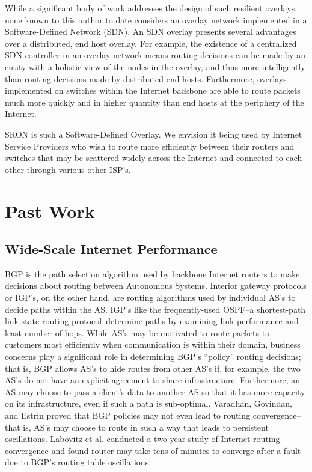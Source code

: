 \documentclass[pageno]{jpaper}
\begin{document}
While a significant body of work addresses the design of such resilient overlays,
none known to this author to date considers an overlay network implemented in a 
Software-Defined Network (SDN).  An SDN overlay presents several advantages over a 
distributed, end host overlay.  For example, the existence of a centralized SDN
controller in an overlay network means routing decisions can be made by an entity 
with a holistic view of the nodes in the overlay, and thus more intelligently than 
routing decisions made by distributed end hosts.  Furthermore, overlays implemented on
switches within the Internet backbone are able to route packets much more quickly and in
higher quantity than end hosts at the periphery of the Internet.

SRON is such a Software-Defined Overlay.  We envision it being used by Internet Service
Providers who wish to route more efficiently between their routers and switches that
may be scattered widely across the Internet and connected to each other through various
other ISP's.  

\section{Past Work}

\subsection{Wide-Scale Internet Performance}
BGP is the path selection algorithm used by backbone Internet routers to make 
decisions about routing between Autonomous Systems.
Interior gateway protocols or IGP's, on the other hand, are routing algorithms used by individual
AS's to decide paths within the AS. IGP's like the frequently-used OSPF\cite{ospfrfc}--a shortest-path link
state routing protocol--determine paths by examining link performance and least
number of hops.  While AS's may be motivated to route packets to customers most 
efficiently when communication is within their domain, business concerns play a 
significant role in determining BGP's ``policy'' routing decisions; that is, BGP
allows AS's to hide routes from other AS's if, for example, the two AS's do not have
an explicit agreement to share infrastructure.  Furthermore, an AS may choose to 
pass a client's data to another AS so that it has more capacity on its infrastructure,
even if such a path is sub-optimal.  Varadhan, Govindan, and Estrin proved that BGP
policies may not even lead to routing convergence--that is, AS's may choose to 
route in such a way that leads to persistent oscillations\cite{varadhan}.  Labovitz et al.\cite{labovitz}
conducted a two year study of Internet routing convergence and found router may take tens of minutes to converge after a fault due to BGP's routing table oscillations. 
\end{document}
